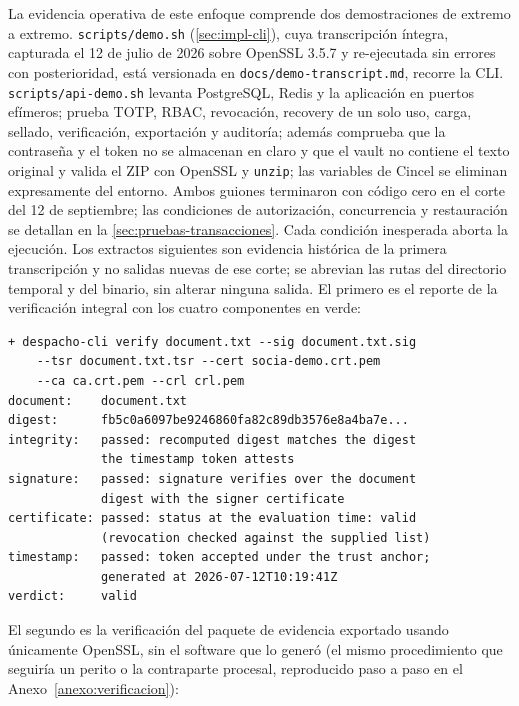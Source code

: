 La evidencia operativa de este enfoque comprende dos demostraciones de extremo a extremo. \texttt{scripts/\allowbreak demo.sh} (\cref{sec:impl-cli}), cuya transcripción íntegra, capturada el 12 de julio de 2026 sobre OpenSSL 3.5.7 y re-ejecutada sin errores con posterioridad, está versionada en \texttt{docs/demo-transcript.md}, recorre la CLI. \texttt{scripts/\allowbreak api-demo.sh} levanta PostgreSQL, Redis y la aplicación en puertos efímeros; prueba TOTP, RBAC, revocación, recovery de un solo uso, carga, sellado, verificación, exportación y auditoría; además comprueba que la contraseña y el token no se almacenan en claro y que el vault no contiene el texto original y valida el ZIP con OpenSSL y \texttt{unzip}; las variables de Cincel se eliminan expresamente del entorno. Ambos guiones terminaron con código cero en el corte del 12 de septiembre; las condiciones de autorización, concurrencia y restauración se detallan en la \cref{sec:pruebas-transacciones}. Cada condición inesperada aborta la ejecución. Los extractos siguientes son evidencia histórica de la primera transcripción y no salidas nuevas de ese corte; se abrevian las rutas del directorio temporal y del binario, sin alterar ninguna salida. El primero es el reporte de la verificación integral con los cuatro componentes en verde:

\begin{lstlisting}[language={},numbers=none,caption={Verificación integral con evidencia íntegra (extracto de \texttt{docs/demo-transcript.md}).},label={lst:pruebas-verify}]
+ despacho-cli verify document.txt --sig document.txt.sig
    --tsr document.txt.tsr --cert socia-demo.crt.pem
    --ca ca.crt.pem --crl crl.pem
document:    document.txt
digest:      fb5c0a6097be9246860fa82c89db3576e8a4ba7e...
integrity:   passed: recomputed digest matches the digest
             the timestamp token attests
signature:   passed: signature verifies over the document
             digest with the signer certificate
certificate: passed: status at the evaluation time: valid
             (revocation checked against the supplied list)
timestamp:   passed: token accepted under the trust anchor;
             generated at 2026-07-12T10:19:41Z
verdict:     valid
\end{lstlisting}

El segundo es la verificación del paquete de evidencia exportado usando únicamente OpenSSL, sin el software que lo generó (el mismo procedimiento que seguiría un perito o la contraparte procesal, reproducido paso a paso en el Anexo~\ref{anexo:verificacion}):

